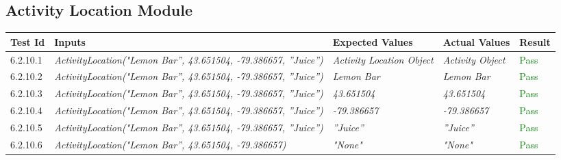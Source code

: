 \documentclass[12pt, titlepage]{article}
\begin{document}
\subsection{Activity Location Module}
\begin{tabular}{ | m{3.5em} | m{5cm}| m{3cm} | m{4cm} | m{1.2cm} | } 
  \hline
  \textbf{Test Id}& \textbf{Inputs} & \textbf{Expected Values} & \textbf{Actual Values} & \textbf{Result} \\ 
  \hline
   6.2.10.1 & \textit{ActivityLocation("Lemon Bar”, 43.651504, -79.386657, ”Juice”)} & \textit{Activity Location Object} & \textit{Activity Object} & \textcolor{green}{Pass} \\ 
  \hline
  6.2.10.2 & \textit{ActivityLocation("Lemon Bar”, 43.651504, -79.386657, ”Juice”)} & \textit{Lemon Bar} & \textit{Lemon Bar} & \textcolor{green}{Pass} \\ 
  \hline
  6.2.10.3 & \textit{ActivityLocation("Lemon Bar”, 43.651504, -79.386657, ”Juice”)} & \textit{43.651504} & \textit{43.651504} & \textcolor{green}{Pass} \\  
  \hline
  6.2.10.4 & \textit{ActivityLocation("Lemon Bar”, 43.651504, -79.386657, ”Juice”)} & \textit{-79.386657} & \textit{-79.386657} & \textcolor{green}{Pass} \\  
  \hline
   6.2.10.5 & \textit{ActivityLocation("Lemon Bar”, 43.651504, -79.386657, ”Juice”)} & \textit{”Juice”} & \textit{”Juice”} & \textcolor{green}{Pass} \\
  \hline
   6.2.10.6 & \textit{ActivityLocation("Lemon Bar”, 43.651504, -79.386657)} & \textit{"None"} & \textit{"None"} & \textcolor{green}{Pass} \\ 
   \hline
\end{tabular}
\end{document}

